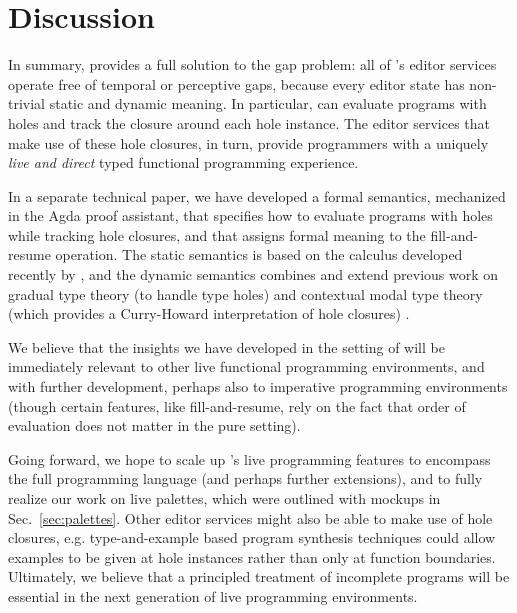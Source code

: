 \section{Discussion}
\label{sec:discussion}
In summary, \Hazel provides a full solution to the gap problem: all of \Hazel's
editor services operate free of temporal or perceptive gaps, because every editor state
has non-trivial static and dynamic meaning. In particular, \Hazel can evaluate programs with holes and track the closure around each hole instance. The editor services that make use of these hole closures, in turn, provide \Hazel programmers with a uniquely 
\emph{live and direct} typed functional programming experience. 

In a separate technical paper,
we have developed a formal semantics,
mechanized in the Agda proof assistant, that
specifies how to evaluate programs with holes while tracking hole closures, and that assigns formal meaning to the fill-and-resume operation. The static semantics is based on the \Hazelnut calculus developed recently by \citet{popl-paper}, and the dynamic semantics combines and extend previous work on gradual type theory (to handle type holes) \cite{Siek06a,DBLP:conf/snapl/SiekVCB15} and contextual modal type theory (which provides a Curry-Howard interpretation of hole closures) \cite{Nanevski2008}. 

We believe that the insights we have developed in the setting of 
\Hazel will be immediately relevant to other
live functional programming environments, and with further development,
perhaps also to imperative programming environments 
(though certain features, like fill-and-resume, rely on the fact
that order of evaluation does not matter in the pure 
setting). 

Going forward, we hope to scale up \Hazel's live programming features  to encompass the full \Elm{} programming language (and perhaps further extensions), and to fully realize our work on live palettes, which were outlined with mockups in Sec.~\ref{sec:palettes}. 
Other editor services might also be able to make use of hole closures, e.g. type-and-example based program synthesis techniques \cite{Osera2015} could allow examples to be given at hole instances rather than only at function boundaries. 
Ultimately, we believe that a principled treatment of incomplete
programs will be essential in the next generation of live programming environments.
